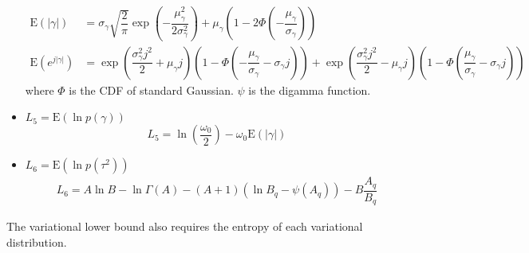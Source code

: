 \documentclass[12pt]{article}
\begin{document}
\begin{itemize}
    \begin{align}
      \mathrm{E}\left(\left|\gamma\right|\right) &= \sigma_{\gamma}\sqrt{\dfrac{2}{\pi}}\exp\left(-\dfrac{\mu_{\gamma}^{2}}{2\sigma_{\gamma}^{2}}\right)+\mu_{\gamma}\left(1-2\Phi\left(-\dfrac{\mu_{\gamma}}{\sigma_{\gamma}}\right)\right)\\
      \mathrm{E}\left(e^{j\left|\gamma\right|}\right) &= \exp\left(\dfrac{\sigma_{\gamma}^{2}j^{2}}{2}+\mu_{\gamma}j\right)\left(1-\Phi\left(-\dfrac{\mu_{\gamma}}{\sigma_{\gamma}}-\sigma_{\gamma}j\right)\right)+\exp\left(\dfrac{\sigma_{\gamma}^{2}j^{2}}{2}-\mu_{\gamma}j\right)\left(1-\Phi\left(\dfrac{\mu_{\gamma}}{\sigma_{\gamma}}-\sigma_{\gamma}j\right)\right)
    \end{align}
    where $\Phi$ is the CDF of standard Gaussian. $\psi$ is the digamma function.
    \item $L_{5} = \mathrm{E}\left(\ln p\left(\gamma\right)\right)$
    \begin{equation}
      L_{5} = \ln\left(\dfrac{\omega_{0}}{2}\right)-\omega_{0}\mathrm{E}\left(\left|\gamma\right|\right)
    \end{equation}
    \item $L_{6}=\mathrm{E}\left(\ln p\left(\tau^{2}\right)\right)$
    \begin{align}
      L_{6} = A\ln B -\ln\Gamma\left(A\right)-\left(A+1\right)\left(\ln B_{q}-\psi\left(A_{q}\right)\right)-B\dfrac{A_{q}}{B_{q}}
    \end{align}
  \end{itemize}
  The variational lower bound also requires the entropy of each variational distribution.
\end{document}
